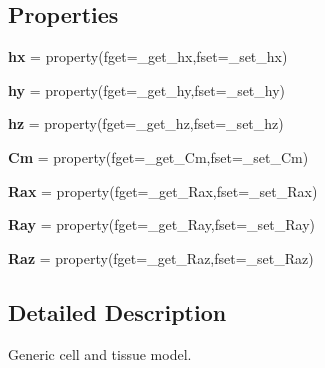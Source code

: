 \subsection*{Properties}
\begin{DoxyCompactItemize}
\item 
\hypertarget{classcell__mdl_1_1_tissue_model_a08b5eddfd7c1e9cf8bca05061b8a1d14}{
{\bfseries hx} = property(fget=\_\-get\_\-hx,fset=\_\-set\_\-hx)}
\label{classcell__mdl_1_1_tissue_model_a08b5eddfd7c1e9cf8bca05061b8a1d14}

\item 
\hypertarget{classcell__mdl_1_1_tissue_model_ac54fda0a1f7b8ee11d4a875abdac270a}{
{\bfseries hy} = property(fget=\_\-get\_\-hy,fset=\_\-set\_\-hy)}
\label{classcell__mdl_1_1_tissue_model_ac54fda0a1f7b8ee11d4a875abdac270a}

\item 
\hypertarget{classcell__mdl_1_1_tissue_model_ad6db23495bdf397ae6cfadb27e7ffdcf}{
{\bfseries hz} = property(fget=\_\-get\_\-hz,fset=\_\-set\_\-hz)}
\label{classcell__mdl_1_1_tissue_model_ad6db23495bdf397ae6cfadb27e7ffdcf}

\item 
\hypertarget{classcell__mdl_1_1_tissue_model_af15c4e8e76b19dde1854faff5a5e16f4}{
{\bfseries Cm} = property(fget=\_\-get\_\-Cm,fset=\_\-set\_\-Cm)}
\label{classcell__mdl_1_1_tissue_model_af15c4e8e76b19dde1854faff5a5e16f4}

\item 
\hypertarget{classcell__mdl_1_1_tissue_model_acc840d5b85ebae92bcb79cd5e732833e}{
{\bfseries Rax} = property(fget=\_\-get\_\-Rax,fset=\_\-set\_\-Rax)}
\label{classcell__mdl_1_1_tissue_model_acc840d5b85ebae92bcb79cd5e732833e}

\item 
\hypertarget{classcell__mdl_1_1_tissue_model_a90c9acd704b08cb90d8d58d8d3e5c7a5}{
{\bfseries Ray} = property(fget=\_\-get\_\-Ray,fset=\_\-set\_\-Ray)}
\label{classcell__mdl_1_1_tissue_model_a90c9acd704b08cb90d8d58d8d3e5c7a5}

\item 
\hypertarget{classcell__mdl_1_1_tissue_model_ad83deb6a3fcac121624e621a4d5e54c8}{
{\bfseries Raz} = property(fget=\_\-get\_\-Raz,fset=\_\-set\_\-Raz)}
\label{classcell__mdl_1_1_tissue_model_ad83deb6a3fcac121624e621a4d5e54c8}

\end{DoxyCompactItemize}


\subsection{Detailed Description}
\begin{DoxyVerb}Generic cell and tissue model.\end{DoxyVerb}
 

